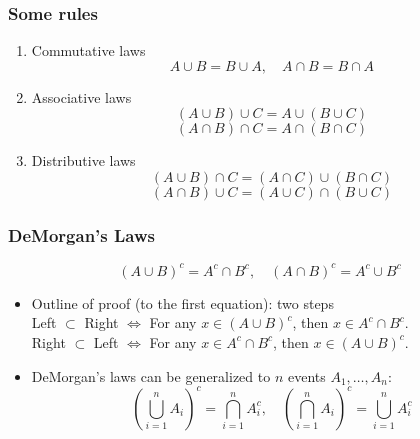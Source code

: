 \documentclass[slidestop,compress,mathserif]{beamer}
\begin{document}
\begin{frame}\frametitle{Some rules}

\begin{enumerate}

\item Commutative laws
\[ A \cup B = B \cup A, \quad A \cap B = B \cap A \]
 

\item Associative laws
\[(A \cup B) \cup C = A \cup (B \cup C) \]
\[(A \cap B) \cap C = A \cap (B \cap C)\]
 

\item Distributive laws
\[(A \cup B) \cap C = (A \cap C) \cup (B \cap C)\]
\[(A \cap B) \cup C = (A \cup C) \cap (B \cup C)\]

\end{enumerate}




\end{frame}

\begin{frame}\frametitle{DeMorgan's Laws}

\[(A \cup B)^c = A^c \cap B^c, \quad
(A \cap B)^c = A^c \cup B^c\]

 

\begin{itemize}
\item Outline of proof (to the first equation): two steps\\
Left $\subset$ Right $\Longleftrightarrow$ For any $x \in (A \cup B)^c$, then $x \in A^c \cap B^c$.\\
Right $\subset$ Left $\Longleftrightarrow$ For any $x \in A^c \cap B^c$, then $x \in (A \cup B)^c$.\\

 
\vspace{2.8cm}
\item DeMorgan's laws can be generalized to $n$ events $A_1, \ldots, A_n$:
\[
\left(\bigcup\limits_{i=1}^n  A_i \right)^c  =  \bigcap_{i=1}^n A_i^c, \quad
\left(\bigcap\limits_{i=1}^n  A_i \right)^c  =  \bigcup_{i=1}^n A_i^c
\]
\end{itemize}

 


\end{frame}
\end{document}

